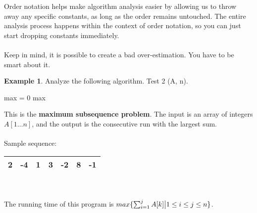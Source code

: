 \documentclass[]{article}
\theoremstyle{definition}
\newtheorem{ex}{Example}[section]
\DeclarePairedDelimiter{\set}{\lbrace}{\rbrace}
\begin{document}
			Order notation helps make algorithm analysis easier by allowing us to throw away any specific constants, as long as the order remains untouched. The entire analysis process happens within the context of order notation, so you can just start dropping constants immediately.
			\\ \\
			Keep in mind, it is possible to create a bad over-estimation. You have to be smart about it.

			\begin{ex}
				Analyze the following algorithm. Test 2 (A, n). \\
				\begin{algorithm}[H]
					max = 0\;
					\Return max
				\end{algorithm}

				This is the \textbf{maximum subsequence problem}. The input is an array of integers $A[1\dots n]$, and the output is the consecutive run with the largest sum.
				\\ \\
				Sample sequence:
				\begin{tabular}{|c|c|c|c|c|c|c|}
					\hline 2 & -4 & 1 & 3 & -2 & 8 & -1 \\ \hline
				\end{tabular}
				\\ \\
				The running time of this program is $max \set{\sum_{i = 1}^{j} A[k] \big| 1 \le i \le j \le n}$.
			\end{ex}
\end{document}
